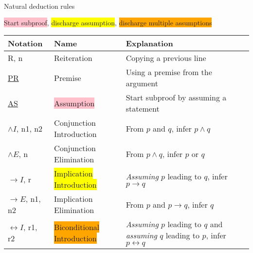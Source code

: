 \documentclass{article}
\begin{document}
\begin{definition}
    {Natural deduction rules}

    \colorbox{pink}{Start subproof}, \colorbox{yellow}{discharge assumption}, \colorbox{orange}{discharge multiple assumptions}

    \begin{tabular}{l|lp{8cm}}
        \hline
        \textbf{Notation}           & \textbf{Name}                                 & \textbf{Explanation}                                                                                                    \\
        \hline
        R, n                        & Reiteration                                   & Copying a previous line                                                                                                 \\
        \underline{PR}              & Premise                                       & Using a premise from the argument                                                                                       \\
        \underline{AS}              & \colorbox{pink}{Assumption}                   & Start subproof by assuming a statement                                                                                  \\
        $\land I$, n1, n2           & Conjunction Introduction                      & From $p$ and $q$, infer $p \land q$                                                                                     \\
        $\land E$, n                & Conjunction Elimination                       & From $p \land q$, infer $p$ or $q$                                                                                      \\
        $\rightarrow I$, r          & \colorbox{yellow}{Implication Introduction}   & \textit{Assuming} $p$ leading to $q$, infer $p \rightarrow q$                                                           \\
        $\rightarrow E$, n1, n2     & Implication Elimination                       & From $p$ and $p \rightarrow q$, infer $q$                                                                               \\
        $\leftrightarrow I$, r1, r2 & \colorbox{orange}{Biconditional Introduction} & \textit{Assuming} $p$ leading to $q$ and \textit{assuming} $q$ leading to $p$, infer $p \leftrightarrow q$              \\

\end{tabular}
\end{definition}
\end{document}
